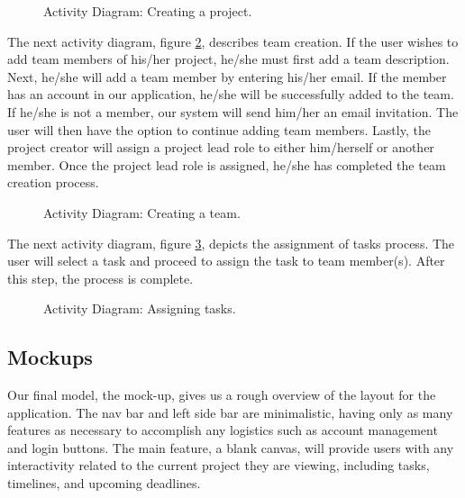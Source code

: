 \begin{figure}[ht]
\centering
{}
\caption{Activity Diagram: Creating a project.}
\label{activityOne}
\end{figure}
\FloatBarrier
\par The next activity diagram, figure \ref{activityTwo}, describes team creation. If the user wishes to add team members of his/her project, he/she must first add a team description. Next, he/she will add a team member by entering his/her email. If the member has an account in our application, he/she will be successfully added to the team. If he/she is not a member, our system will send him/her an email invitation. The user will then have the option to continue adding team members. Lastly, the project creator will assign a project lead role to either him/herself or another member. Once the project lead role is assigned, he/she has completed the team creation process. 


\begin{figure}[ht]
\centering
{}
\caption{Activity Diagram: Creating a team.}
\label{activityTwo}
\end{figure}
\FloatBarrier

\par The next activity diagram, figure \ref{activityFour}, depicts the assignment of  tasks process. The user will select a task and proceed to assign the task to team member(s). After this step, the process is complete. 

\begin{figure}[ht]
\centering
{}
\caption{Activity Diagram: Assigning tasks.}
\label{activityFour}
\end{figure}
\FloatBarrier


\subsection{Mockups}

Our final model, the mock-up, gives us a rough overview of the layout for the application. The nav bar and left side bar are minimalistic, having only as many features as necessary to accomplish any logistics such as account management and login buttons. The main feature, a blank canvas, will provide users with any interactivity related to the current project they are viewing, including tasks, timelines, and upcoming deadlines. 

